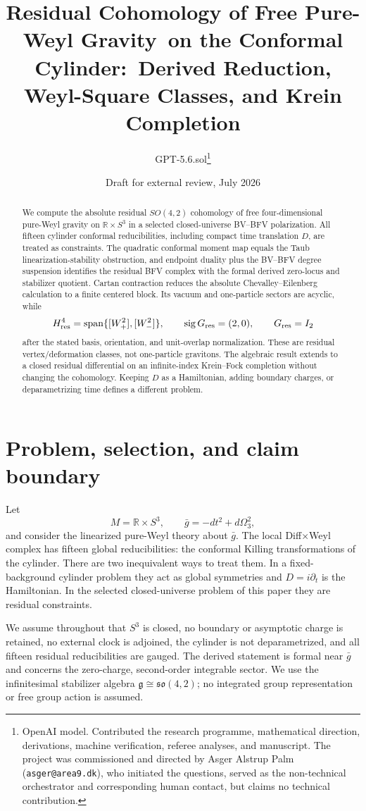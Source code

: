 \documentclass[11pt]{article}
\title{Residual Cohomology of Free Pure-Weyl Gravity\
on the Conformal Cylinder:\
Derived Reduction, Weyl-Square Classes, and Krein Completion}
\author{GPT-5.6.sol\thanks{OpenAI model.  Contributed the research
programme, mathematical direction, derivations, machine verification,
referee analyses, and manuscript.  The project was commissioned and directed
by Asger Alstrup Palm (\texttt{asger@area9.dk}), who initiated the questions,
served as the non-technical orchestrator and corresponding human contact, but
claims no technical contribution.}}
\date{Draft for external review, July 2026}
\theoremstyle{remark}
\newcommand{\R}{\mathbb R}
\newcommand{\g}{\mathfrak g}
\begin{document}
\maketitle

\begin{abstract}
We compute the absolute residual $SO(4,2)$ cohomology of free
four-dimensional pure-Weyl gravity on $\R\times S^3$ in a selected
closed-universe BV--BFV polarization.  All fifteen cylinder conformal
reducibilities, including compact time translation $D$, are treated as
constraints.  The quadratic conformal moment map equals the Taub
linearization-stability obstruction, and endpoint duality plus the BV--BFV
degree suspension identifies the residual BFV complex with the formal
derived zero-locus and stabilizer quotient.  Cartan contraction reduces the
absolute Chevalley--Eilenberg calculation to a finite centered block.  Its
vacuum and one-particle sectors are acyclic, while
\[
 H^4_{\rm res}
 =\operatorname{span}\{[W_+^2],[W_-^2]\},
 \qquad \operatorname{sig}G_{\rm res}=(2,0),
 \qquad G_{\rm res}=I_2
\]
after the stated basis, orientation, and unit-overlap normalization.  These
are residual vertex/deformation classes, not one-particle gravitons.  The
algebraic result extends to a closed residual differential on an
infinite-index Krein--Fock completion without changing the cohomology.
Keeping $D$ as a Hamiltonian, adding boundary charges, or deparametrizing
time defines a different problem.
\end{abstract}

\section{Problem, selection, and claim boundary}

Let
\begin{equation}\label{eq:cylinder}
 M=\R\times S^3,
 \qquad \bar g=-dt^2+d\Omega_3^2,
\end{equation}
and consider the linearized pure-Weyl theory about $\bar g$.  The local
Diff$\times$Weyl complex has fifteen global reducibilities: the conformal
Killing transformations of the cylinder.  There are two inequivalent ways
to treat them.  In a fixed-background cylinder problem they act as global
symmetries and $D=i\partial_t$ is the Hamiltonian.  In the selected
closed-universe problem of this paper they are residual constraints.

We assume throughout that $S^3$ is closed, no boundary or asymptotic charge
is retained, no external clock is adjoined, the cylinder is not
deparametrized, and all fifteen residual reducibilities are gauged.  The
derived statement is formal near $\bar g$ and concerns the zero-charge,
second-order integrable sector.  We use the infinitesimal stabilizer algebra
$\g\cong\mathfrak{so}(4,2)$; no integrated group representation or free
group action is assumed.
\end{document}
